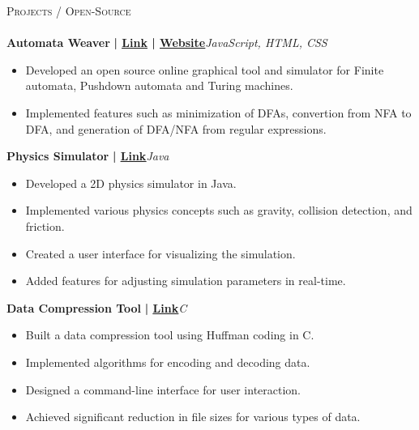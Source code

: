 \documentclass[a4paper]{article}
\newcommand{\lineunder} {
    \vspace*{-8pt} \\
    \hspace*{-18pt} \hrulefill \\
}
\newcommand{\header} [1] {
    {\hspace*{-18pt}\vspace*{6pt} \textsc{#1}}
    \vspace*{-6pt} \lineunder
}
\begin{document}
      \header{Projects / Open-Source}
      \vspace{2mm}
      {\textbf{Automata Weaver}}\textbf{ | \href{https://github.com/syedhuzaif199/automata-weaver}{\underline{Link}} | \href{https://syedhuzaif199.github.io/automata-weaver}{\underline{Website}}}\hfill{\sl JavaScript, HTML, CSS}\\
          \vspace{-1mm}
\begin{itemize} \itemsep -3pt
\item  Developed an open source online graphical tool and simulator for Finite automata, Pushdown automata and Turing machines.
\item  Implemented features such as minimization of DFAs, convertion from NFA to DFA, and generation of DFA/NFA from regular expressions.
\end{itemize}
          \vspace*{3mm}
      {\textbf{Physics Simulator}}\textbf{ | \href{https://github.com/syedhuzaif199/physics-simulator}{\underline{Link}}}\hfill{\sl Java}\\
          \vspace{-1mm}
\begin{itemize} \itemsep -3pt
\item Developed a 2D physics simulator in Java.
\item Implemented various physics concepts such as gravity, collision detection, and friction.
\item Created a user interface for visualizing the simulation.
\item Added features for adjusting simulation parameters in real-time.
\end{itemize}
          \vspace*{3mm}
      {\textbf{Data Compression Tool}}\textbf{ | \href{https://github.com/syedhuzaif199/data-compression-tool}{\underline{Link}}}\hfill{\sl C}\\
          \vspace{-1mm}
\begin{itemize} \itemsep -3pt
\item Built a data compression tool using Huffman coding in C.
\item Implemented algorithms for encoding and decoding data.
\item Designed a command-line interface for user interaction.
\item Achieved significant reduction in file sizes for various types of data.
\end{itemize}
\end{document}
